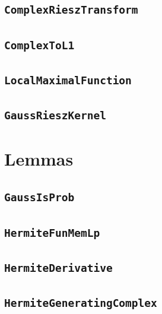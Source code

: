 \documentclass[11pt]{amsart}
\theoremstyle{definition}
\begin{document}
\subsection{\texorpdfstring{\texttt{ComplexRieszTransform}}{ComplexRieszTransform}}\label{node:ComplexRieszTransform}


\subsection{\texorpdfstring{\texttt{ComplexToL1}}{ComplexToL1}}\label{node:ComplexToL1}


\subsection{\texorpdfstring{\texttt{LocalMaximalFunction}}{LocalMaximalFunction}}\label{node:LocalMaximalFunction}


\subsection{\texorpdfstring{\texttt{GaussRieszKernel}}{GaussRieszKernel}}\label{node:GaussRieszKernel}


\section{Lemmas}
\subsection{\texorpdfstring{\texttt{GaussIsProb}}{GaussIsProb}}\label{node:GaussIsProb}


\subsection{\texorpdfstring{\texttt{HermiteFunMemLp}}{HermiteFunMemLp}}\label{node:HermiteFunMemLp}


\subsection{\texorpdfstring{\texttt{HermiteDerivative}}{HermiteDerivative}}\label{node:HermiteDerivative}


\subsection{\texorpdfstring{\texttt{HermiteGeneratingComplex}}{HermiteGeneratingComplex}}\label{node:HermiteGeneratingComplex}

\end{document}
